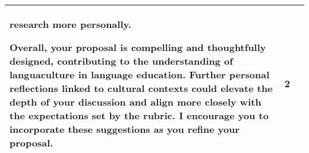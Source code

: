\begin{center}
\begin{longtable}{|p{}|p{}|p{}|}
research more personally.\par Overall, your proposal is compelling and thoughtfully designed, contributing to the understanding of languaculture in language education. Further personal reflections linked to cultural contexts could elevate the depth of your discussion and align more closely with the expectations set by the rubric. I encourage you to incorporate these suggestions as you refine your proposal. & 2 \\
\hline
\end{longtable}
\end{center}
